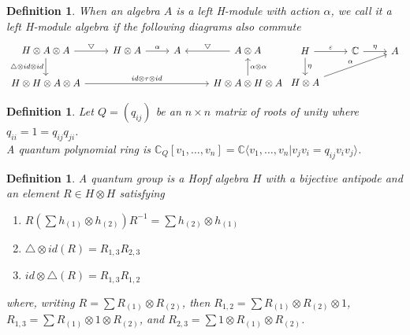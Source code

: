 \documentclass[12pt,a4paper]{article}
\newtheorem{definition}[theorem]{Definition}
\newcommand\1{_{(1)}}
\newcommand\2{_{(2)}}
\begin{document}
\begin{definition}
When an algebra $A$ is a left H-module with action $\alpha$, we call it a left H-module algebra if the following diagrams also commute
\[
\begin{tikzcd}
H\otimes A\otimes A \arrow[r, "\bigtriangledown"] \arrow[d, "\triangle\otimes id\otimes id"'] & H\otimes A \arrow[r, "\alpha"] & A & A\otimes A \arrow[l, "\bigtriangledown"']                         \\
H\otimes H\otimes A\otimes A \arrow[rrr, "id\otimes\tau\otimes id"]                        &                                &   & H\otimes A\otimes H\otimes A \arrow[u, "\alpha\otimes\alpha"']
\end{tikzcd}
\begin{tikzcd}
H \arrow[r, "\varepsilon"] \arrow[d, "\eta"] & \mathbb{C} \arrow[r, "\eta"] & A \\
H\otimes A \arrow[rru, "\alpha"]             &                       &  
\end{tikzcd}
\]
\end{definition}

\begin{definition}
Let $Q=(q_{ij})$ be an $n\times n$ matrix of roots of unity where $q_{ii}=1=q_{ij}q_{ji}$.
\\A quantum polynomial ring is $\mathbb{C}_Q[v_1,\ldots,v_n]=\mathbb{C}\langle v_1,\ldots,v_n\vert v_jv_i=q_{ij}v_iv_j\rangle$.
\end{definition}

\begin{definition}
A quantum group is a Hopf algebra $H$ with a bijective antipode and an element $R\in H\otimes H$ satisfying 
\begin{enumerate}
    \item $R\left(\sum h\1\otimes h\2\right)R^{-1}=\sum h\2\otimes h\1$
    \item $\triangle\otimes id(R)=R_{1,3}R_{2,3}$
    \item $id\otimes\triangle(R)=R_{1,3}R_{1,2}$
\end{enumerate}
where, writing $R=\sum R\1\otimes R\2$, then $R_{1,2}=\sum R\1\otimes R\2\otimes 1$, $R_{1,3}=\sum R\1\otimes 1\otimes R\2$, and $R_{2,3}=\sum 1\otimes R\1\otimes R\2$.
\end{definition}
\end{document}
